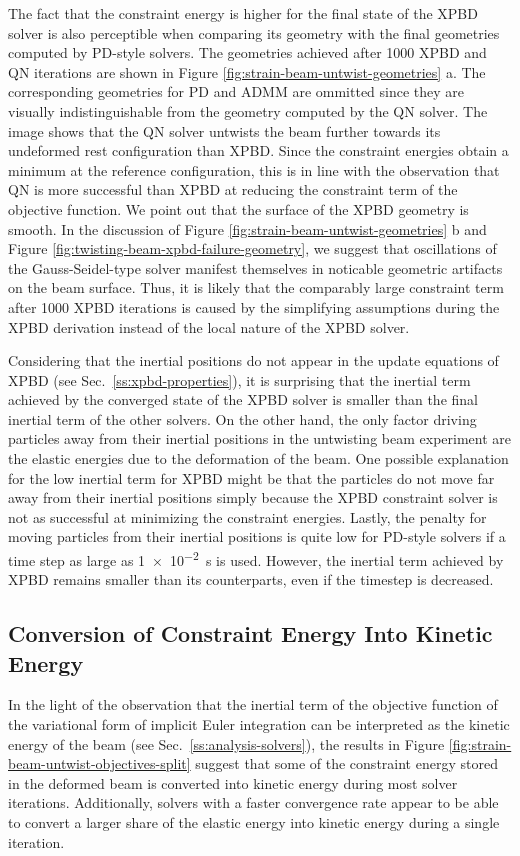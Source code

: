 The fact that the constraint energy is higher for the final state of the XPBD solver is also perceptible when comparing its geometry with the final geometries computed 
by PD-style solvers. The geometries achieved after 1000 XPBD and QN iterations are shown in Figure \ref{fig:strain-beam-untwist-geometries} a. 
The corresponding geometries for PD and ADMM are ommitted since they are visually indistinguishable from the geometry computed by the QN solver. The image shows 
that the QN solver untwists the beam further towards its undeformed rest configuration than XPBD. Since the constraint energies obtain a minimum at the reference 
configuration, this is in line with the observation that QN is more successful than XPBD at reducing the constraint term of the objective function. We point out that 
the surface of the XPBD geometry is smooth. In the discussion of Figure \ref{fig:strain-beam-untwist-geometries} b and Figure \ref{fig:twisting-beam-xpbd-failure-geometry},
we suggest that oscillations of the Gauss-Seidel-type solver manifest themselves in noticable geometric artifacts on the beam surface. Thus, it is likely that 
the comparably large constraint term after 1000 XPBD iterations is caused by the simplifying assumptions during the XPBD derivation instead of the local nature of 
the XPBD solver.

Considering that the inertial positions do not appear in the update equations of XPBD (see Sec.\ \ref{ss:xpbd-properties}), it is surprising that the inertial term achieved 
by the converged state of the XPBD solver is smaller than the final inertial term of the other solvers. On the other hand, the only factor driving particles away from 
their inertial positions in the untwisting beam experiment are the elastic energies due to the deformation of the beam. One possible explanation for the low inertial 
term for XPBD might be that the particles do not move far away from their inertial positions simply because the XPBD constraint solver is not as successful at 
minimizing the constraint energies. Lastly, the penalty for moving particles from their inertial positions is quite low for PD-style solvers if a time step as large 
as \SI{1e-2}{\second} is used. However, the inertial term achieved by XPBD remains smaller than its counterparts, even if the timestep is decreased.

\subsection{Conversion of Constraint Energy Into Kinetic Energy}\label{ss:conversion-constraint-kinetic}
In the light of the observation that the inertial term of the objective function of the variational form of implicit Euler integration can be interpreted as the kinetic 
energy of the beam (see Sec.\ \ref{ss:analysis-solvers}), the results in Figure \ref{fig:strain-beam-untwist-objectives-split} suggest that some of the 
constraint energy stored in the deformed beam is converted into kinetic energy during most solver iterations. Additionally, solvers with a 
faster convergence rate appear to be able to convert a larger share of the elastic energy into kinetic energy during a single iteration. 

